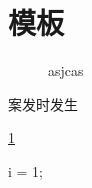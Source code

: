 \documentclass{cumcmthesis}
\begin{document}
\maketitle

\begin{abstract}
  \zhlipsum[1]
\end{abstract}

\newpage

\section{模板}

\begin{figure}[htbp]
  \caption{asjcas}\label{fig1}
\end{figure}

\begin{table}[htbp]
  \caption{案发时发生}
\end{table}\ref{fig1}
\begin{matlab}
  i = 1;
\end{matlab}
\end{document}
